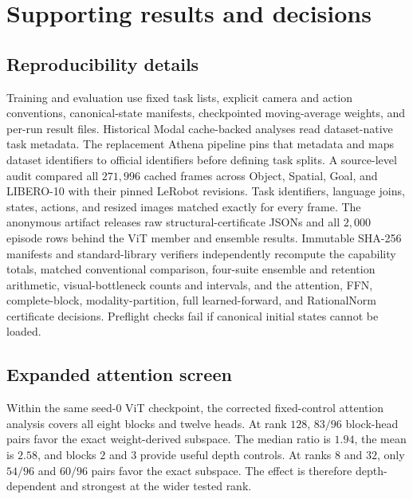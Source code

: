 \documentclass{article}
\begin{document}
\appendix
\renewcommand{\theHfigure}{A.\arabic{figure}}
\raggedbottom
\section{Supporting results and decisions}



\subsection{Reproducibility details}
\label{app:reproducibility}

Training and evaluation use fixed task lists, explicit camera and action conventions,
canonical-state manifests, checkpointed moving-average weights, and per-run result files.
Historical Modal cache-backed analyses read dataset-native task metadata. The replacement Athena
pipeline pins that metadata and maps dataset identifiers to official identifiers before defining
task splits. A source-level audit compared all $271{,}996$ cached frames across Object, Spatial,
Goal, and LIBERO-10 with their pinned LeRobot revisions. Task identifiers, language joins, states,
actions, and resized images matched exactly for every frame. The anonymous artifact releases raw
structural-certificate JSONs and all $2{,}000$ episode rows behind the ViT member and ensemble
results. Immutable SHA-256 manifests and standard-library verifiers independently recompute the
capability totals, matched conventional comparison, four-suite ensemble and retention arithmetic, visual-bottleneck counts and intervals, and the attention, FFN, complete-block,
modality-partition, full learned-forward, and RationalNorm certificate decisions. Preflight checks
fail if canonical initial states cannot be loaded.

\subsection{Expanded attention screen}
\label{app:expanded-mechanisms}

Within the same seed-$0$ ViT checkpoint, the corrected fixed-control attention analysis covers
all eight blocks and twelve heads. At
rank $128$, $83/96$ block-head pairs favor the exact weight-derived subspace. The median ratio
is $1.94$, the mean is $2.58$, and blocks $2$ and $3$ provide useful depth controls.
At ranks $8$ and $32$, only $54/96$ and $60/96$ pairs favor the exact subspace. The effect is
therefore depth-dependent and strongest at the wider tested rank.
\end{document}
